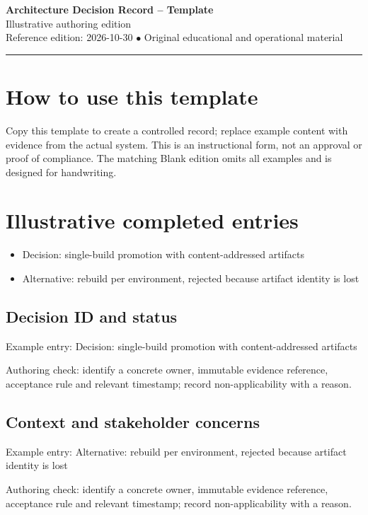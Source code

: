 \documentclass[10pt,letterpaper]{article}
\begin{document}
\begin{center}
{\LARGE\bfseries\color{cdblue}Architecture Decision Record -- Template}\\[7pt]
{\large Illustrative authoring edition}\\[6pt]
{\small Reference edition: 2026-10-30 $\bullet$ Original educational and operational material}
\end{center}
\noindent\color{cdblue}\rule{\linewidth}{1.2pt}\color{black}
\vspace{0.4em}
\section{How to use this template}
Copy this template to create a controlled record; replace example content with evidence from the actual system. This is an instructional form, not an approval or proof of compliance. The matching Blank edition omits all examples and is designed for handwriting.


\section{Illustrative completed entries}
\begin{itemize}
\item Decision: single-build promotion with content-addressed artifacts
\item Alternative: rebuild per environment, rejected because artifact identity is lost
\end{itemize}

\subsection{Decision ID and status}
Example entry: Decision: single-build promotion with content-addressed artifacts

Authoring check: identify a concrete owner, immutable evidence reference, acceptance rule and relevant timestamp; record non-applicability with a reason.


\subsection{Context and stakeholder concerns}
Example entry: Alternative: rebuild per environment, rejected because artifact identity is lost

Authoring check: identify a concrete owner, immutable evidence reference, acceptance rule and relevant timestamp; record non-applicability with a reason.
\end{document}
